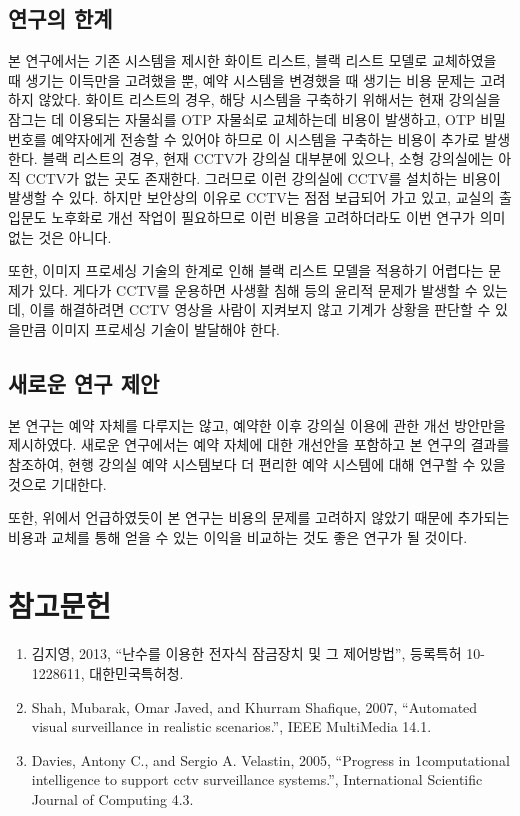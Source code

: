 \documentclass[11pt,a4paper]{article}
\begin{document}
\subsection{연구의 한계}
본 연구에서는 기존 시스템을 제시한 화이트 리스트, 블랙 리스트 모델로 교체하였을
때 생기는 이득만을 고려했을 뿐, 예약 시스템을 변경했을 때 생기는 비용 문제는
고려하지 않았다.
화이트 리스트의 경우, 해당 시스템을 구축하기 위해서는 현재 강의실을 잠그는 데
이용되는 자물쇠를 OTP 자물쇠로 교체하는데 비용이 발생하고, OTP 비밀번호를
예약자에게 전송할 수 있어야 하므로 이 시스템을 구축하는 비용이 추가로 발생한다.
블랙 리스트의 경우, 현재 CCTV가 강의실 대부분에 있으나, 소형 강의실에는 아직
CCTV가 없는 곳도 존재한다. 그러므로 이런 강의실에 CCTV를 설치하는 비용이 발생할
수 있다.
하지만 보안상의 이유로 CCTV는 점점 보급되어 가고 있고, 교실의 출입문도 노후화로
개선 작업이 필요하므로 이런 비용을 고려하더라도 이번 연구가 의미 없는 것은
아니다.

또한, 이미지 프로세싱 기술의 한계로 인해 블랙 리스트 모델을 적용하기 어렵다는
문제가 있다.
게다가 CCTV를 운용하면 사생활 침해 등의 윤리적 문제가 발생할 수 있는데, 이를
해결하려면 CCTV 영상을 사람이 지켜보지 않고 기계가 상황을 판단할 수 있을만큼
이미지 프로세싱 기술이 발달해야 한다.

\subsection{새로운 연구 제안}
본 연구는 예약 자체를 다루지는 않고, 예약한 이후 강의실 이용에 관한 개선
방안만을 제시하였다. 새로운 연구에서는 예약 자체에 대한 개선안을 포함하고 본
연구의 결과를 참조하여, 현행 강의실 예약 시스템보다 더 편리한 예약 시스템에
대해 연구할 수 있을 것으로 기대한다.

또한, 위에서 언급하였듯이 본 연구는 비용의 문제를 고려하지 않았기 때문에
추가되는 비용과 교체를 통해 얻을 수 있는 이익을 비교하는 것도 좋은 연구가 될
것이다.

\section{참고문헌}
\begin{enumerate}
\item 김지영, 2013, ``난수를 이용한 전자식 잠금장치 및 그 제어방법'', 등록특허 10-1228611, 대한민국특허청.
\item Shah, Mubarak, Omar Javed, and Khurram Shafique, 2007, ``Automated visual surveillance in realistic scenarios.'', IEEE MultiMedia 14.1.
\item Davies, Antony C., and Sergio A. Velastin, 2005, ``Progress in 1computational intelligence to support cctv surveillance systems.'', International Scientific Journal of Computing 4.3.
\end{enumerate}
\end{document}
